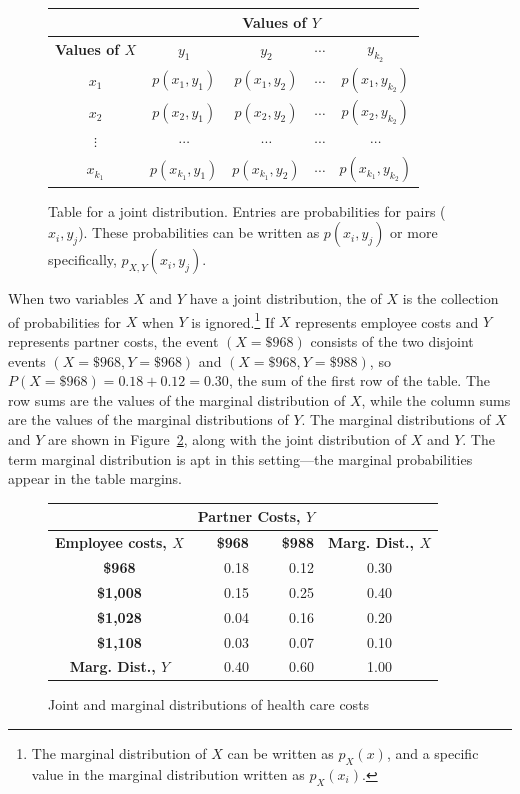 \begin{figure}[h]
	\centering
	\begin{tabular}{ccccc}
		\hline
		& \multicolumn{4}{c}{\textbf{Values of $Y$}} \\
		\hline
		\textbf{Values of $X$} & $y_1$ & $y_2$ & $\cdots$ & $y_{k_2}$ \\
		$x_1$ &   $p(x_1, y_1)$ &   $p(x_1, y_2)$  & $\cdots$  & $p(x_1, y_{k_2})$  \\
		$x_2$ &  $p(x_2, y_1)$   &  $p(x_2, y_2)$  & $\cdots$ &   $p(x_2, y_{k_2})$ \\
		$\vdots$ &   $\cdots$  &  $\cdots$  &  $\cdots$ &   $\cdots$ \\
		$x_{k_1}$ & $p(x_{k_1}, y_1)$ &  $p(x_{k_1}, y_2)$  &  $\cdots$ & $p(x_{k_1}, y_{k_2})$\vspace{1.5mm} \\
		\hline
	\end{tabular}
	\caption{Table for a joint distribution. Entries are probabilities for pairs ($x_i, y_j$). These probabilities can be written as $p(x_i, y_j)$ or more specifically, $p_{X, Y}(x_i, y_j)$.}
	\label{table:generalJointDistribution}
\end{figure}

When two variables $X$ and $Y$ have a joint distribution, the  of $X$ is the collection of probabilities for $X$ when $Y$ is ignored.\footnote{The marginal distribution of $X$ can be written as $p_X(x)$, and a specific value in the marginal distribution written as $p_X(x_i)$.}  If $X$ represents employee costs and $Y$ represents partner costs, the event $(X = \$968)$ consists of the two  disjoint events $(X = \$968, Y = \$968)$ and $(X = \$968, Y = \$988)$, so $P(X = \$968) = 0.18 + 0.12 = 0.30$, the sum of the first row of the table. The row sums are the values of the marginal distribution of $X$, while the column sums are the values of the marginal distributions of $Y$. The marginal distributions of $X$ and $Y$ are shown in Figure~\ref{healthExpensesJointMarginalDistribution}, along with the joint distribution of $X$ and $Y$. The term marginal distribution is apt in this setting---the marginal probabilities appear in the table margins.

\begin{figure}[h]
	\centering
	\begin{tabular}{c|rr | c}
		&   \multicolumn{2}{c}{\textbf{Partner Costs, $Y$}} & \\
		\hline
		\textbf{Employee costs, $X$} & \textbf{\$968} & \textbf{\$988} &  \textbf{Marg. Dist., $X$} \\ 
		\hline
		\textbf{\$968} & 0.18 & 0.12 & 0.30\\ 
		\textbf{\$1,008} & 0.15 & 0.25 & 0.40 \\ 
		\textbf{\$1,028}  & 0.04 & 0.16 & 0.20\\ 
		\textbf{\$1,108}  & 0.03 & 0.07  & 0.10\\ 
		\hline
		\textbf{Marg. Dist., $Y$} & 0.40 & 0.60 & 1.00 \\
	\end{tabular}
	\caption{Joint and marginal distributions of health care costs} 
	\label{healthExpensesJointMarginalDistribution}
\end{figure}

